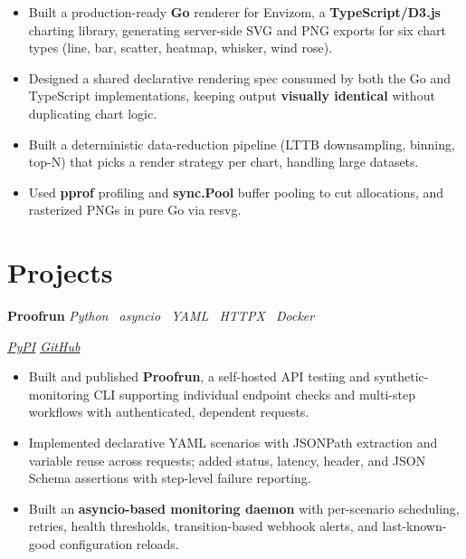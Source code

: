 \documentclass[10pt,a4paper]{article}
\newcommand{\projectentry}[3]{%
    \noindent
    \begin{minipage}[t]{0.66\linewidth}
        \raggedright
        \textbf{#1}
        \hspace{0.7em}
        \textit{\color{textgray}#2}
    \end{minipage}%
    \hfill
    \begin{minipage}[t]{0.30\linewidth}
        \raggedleft
        \itshape\color{textgray}#3
    \end{minipage}%
    \par
}
\begin{document}
\begin{itemize}

    \item Built a production-ready \textbf{Go} renderer for Envizom, a \textbf{TypeScript/D3.js} charting library, generating server-side SVG and PNG exports for six chart types (line, bar, scatter, heatmap, whisker, wind rose).

    \item Designed a shared declarative rendering spec consumed by both the Go and TypeScript implementations, keeping output \textbf{visually identical} without duplicating chart logic.

    \item Built a deterministic data-reduction pipeline (LTTB downsampling, binning, top-N) that picks a render strategy per chart, handling large datasets.

    \item Used \textbf{pprof} profiling and \textbf{sync.Pool} buffer pooling to cut allocations, and rasterized PNGs in pure Go via resvg.

\end{itemize}

\section*{Projects}

\projectentry
    {Proofrun}
    {Python \textperiodcentered\ asyncio \textperiodcentered\ YAML \textperiodcentered\ HTTPX \textperiodcentered\ Docker}
    {\href{https://pypi.org/project/proofrun/}{PyPI}
    \quad
    \href{https://github.com/Kishan-Thanki/proofrun}{GitHub}}

\vspace{1pt}

\begin{itemize}

    \item Built and published \textbf{Proofrun}, a self-hosted API testing and synthetic-monitoring CLI supporting individual endpoint checks and multi-step workflows with authenticated, dependent requests.

    \item Implemented declarative YAML scenarios with JSONPath extraction and variable reuse across requests; added status, latency, header, and JSON Schema assertions with step-level failure reporting.

    \item Built an \textbf{asyncio-based monitoring daemon} with per-scenario scheduling, retries, health thresholds, transition-based webhook alerts, and last-known-good configuration reloads.

\end{itemize}
\end{document}
